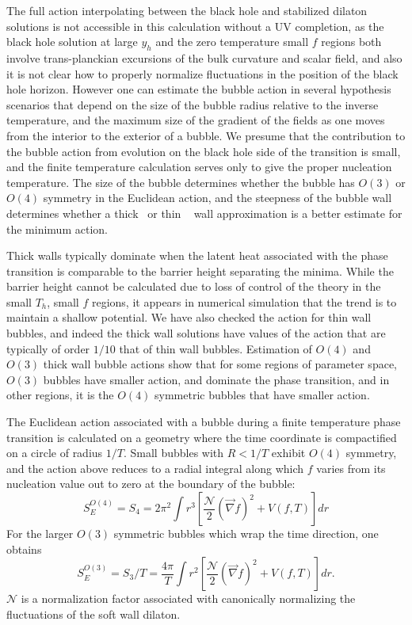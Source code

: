 \documentclass[12pt]{article}
\begin{document}
The full action interpolating between the black hole and stabilized dilaton solutions is not accessible in this calculation without a UV completion, as the black hole solution at large $y_h$ and the zero temperature small $f$ regions both involve 
trans-planckian excursions of the bulk curvature and scalar field, and also it is not clear how to properly normalize fluctuations in the position of the black hole horizon.  However one can estimate the bubble action in several hypothesis scenarios that depend on the size of the bubble radius relative to the inverse temperature, and the maximum size of the gradient of the fields as one moves from the interior to the exterior of a bubble.  We presume that the contribution to the bubble action from evolution on the black hole side of the transition is small, and the finite temperature calculation serves only to give the proper nucleation temperature.  The size of the bubble determines whether the bubble has $O(3)$ or $O(4)$ symmetry in the Euclidean action, and the steepness of the bubble wall determines whether a thick~\cite{Anderson:1991zb} or thin ~\cite{ColemanVacDecay} wall approximation is a better estimate for the minimum action.

Thick walls typically dominate when the latent heat associated with the phase transition is comparable to the barrier height separating the minima.  While the barrier height cannot be calculated due to loss of control of the theory in the small $T_h$, small $f$ regions, it appears in numerical simulation that the trend is to maintain a shallow potential.  We have also checked the action for thin wall bubbles, and indeed the thick wall solutions have values of the action that are typically of order $1/10$ that of thin wall bubbles.  Estimation of $O(4)$ and $O(3)$ thick wall bubble actions show that for some regions of parameter space, $O(3)$ bubbles have smaller action, and dominate the phase transition, and in other regions, it is the $O(4)$ symmetric bubbles that have smaller action.

The Euclidean action associated with a bubble during a finite temperature phase transition is calculated on a geometry where the time coordinate is compactified on a circle of radius $1/T$.  Small bubbles with $R < 1/T$ exhibit $O(4)$ symmetry, and the action above reduces to a radial integral along which $f$ varies from its nucleation value out to zero at the boundary of the bubble:
\begin{equation}
S_E^{O(4)} = S_4 = 2 \pi^2 \int r^3 \left[\frac{{\mathcal N}}{2} \left(\vec{\nabla} f \right)^2 + V\left(f, T\right)\right] dr
\end{equation}
For the larger $O(3)$ symmetric bubbles which wrap the time direction, one obtains
\begin{equation}
S_E^{O(3)}=S_3/T = \frac{4 \pi}{T} \int r^2 \left[\frac{{\mathcal N}}{2} \left(\vec{\nabla} f \right)^2 + V\left(f, T\right)\right] dr.
\end{equation}
${\mathcal N}$ is a normalization factor associated with canonically normalizing the fluctuations of the soft wall dilaton. 
\end{document}
